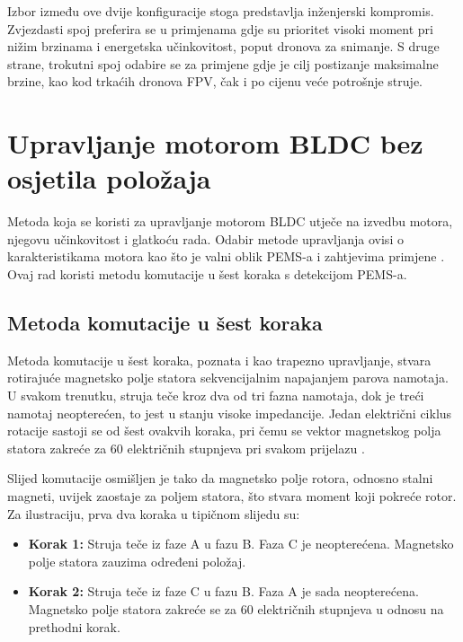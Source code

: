 \documentclass[diplomskirad]{fer}
\begin{document}
Izbor između ove dvije konfiguracije stoga predstavlja inženjerski kompromis.
Zvjezdasti spoj preferira se u primjenama gdje su prioritet visoki moment pri
nižim brzinama i energetska učinkovitost, poput dronova za snimanje. S druge
strane, trokutni spoj odabire se za primjene gdje je cilj postizanje maksimalne
brzine, kao kod trkaćih dronova FPV, čak i po cijenu veće potrošnje struje.

\newpage

\chapter{Upravljanje motorom BLDC bez osjetila položaja}
\label{pog:bldc_upravljanje_bez_senzora}

Metoda koja se koristi za upravljanje motorom BLDC utječe na izvedbu motora,
njegovu učinkovitost i glatkoću rada. Odabir metode upravljanja ovisi o
karakteristikama motora kao što je valni oblik PEMS-a i zahtjevima primjene
\cite{cite:bldc}. Ovaj rad koristi metodu komutacije u šest koraka s detekcijom
PEMS-a.

\section{Metoda komutacije u šest koraka}
\label{sec:six-step}

Metoda komutacije u šest koraka, poznata i kao trapezno upravljanje, stvara
rotirajuće magnetsko polje statora sekvencijalnim napajanjem parova namotaja. U
svakom trenutku, struja teče kroz dva od tri fazna namotaja, dok je treći
namotaj neopterećen, to jest u stanju visoke impedancije. Jedan električni
ciklus rotacije sastoji se od šest ovakvih koraka, pri čemu se vektor
magnetskog polja statora zakreće za 60 električnih stupnjeva pri svakom
prijelazu \cite{cite:bldc, NXP_AN2355}.

Slijed komutacije osmišljen je tako da magnetsko polje rotora, odnosno stalni
magneti, uvijek zaostaje za poljem statora, što stvara moment koji pokreće
rotor. Za ilustraciju, prva dva koraka u tipičnom slijedu su:

\begin{itemize}
	\item \textbf{Korak 1:} Struja teče iz faze A u fazu B. Faza C je neopterećena. Magnetsko polje statora zauzima određeni položaj.

	\item \textbf{Korak 2:} Struja teče iz faze C u fazu B. Faza A je sada neopterećena. Magnetsko polje statora zakreće se za 60 električnih stupnjeva u odnosu na prethodni korak.
\end{itemize}
\end{document}
